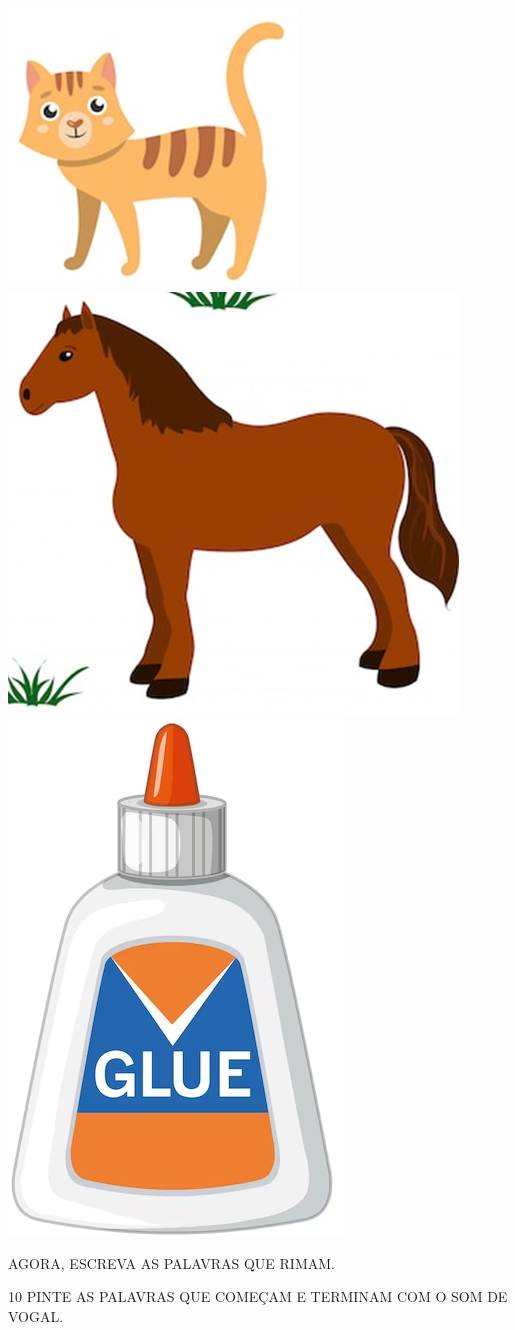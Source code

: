\includegraphics[width=.25\textwidth]{media/image34.png}
\includegraphics[width=.25\textwidth]{media/image35.png}
\includegraphics[width=.15\textwidth]{media/image36.png}



\pagebreak
AGORA, ESCREVA AS PALAVRAS QUE RIMAM.



\num{10} PINTE AS PALAVRAS QUE COMEÇAM E TERMINAM COM O SOM DE VOGAL.\bigskip


